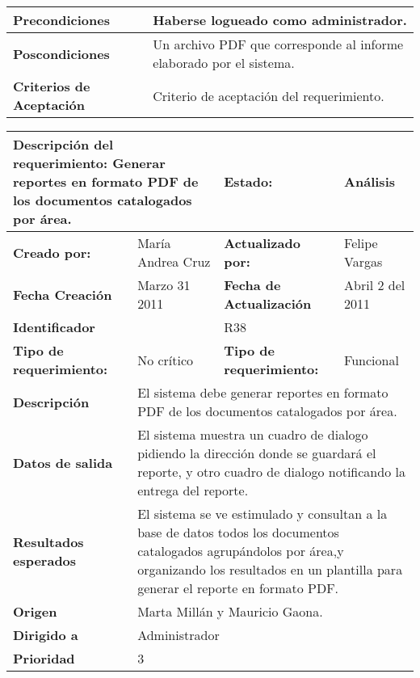 \begin{center}
\begin{longtable}{|p{3cm}|p{3cm}|p{3cm}|p{3cm}|}
\bf Precondiciones &\multicolumn{3}{|p{10cm}|}{Haberse logueado como administrador.} \\
\hline
\hline
\bf Poscondiciones &\multicolumn{3}{|p{10cm}|}{Un archivo PDF que corresponde al informe elaborado por el sistema.} \\
\hline
\bf Criterios de Aceptación &\multicolumn{3}{|p{10cm}|}{Criterio de aceptación del requerimiento.} \\
\hline

\end{longtable}


\begin{longtable}{|p{3cm}|p{3cm}|p{3cm}|p{3cm}|}

\hline
\multicolumn{2}{|p{6cm}|}{{\bf {Descripción del requerimiento:}}  Generar reportes en formato PDF de los documentos catalogados por área. } & \bf{ Estado:} & {Análisis} \\
\hline
\bf {Creado por:} & María Andrea Cruz   & \bf {Actualizado por:} & Felipe Vargas  \\
\hline
\bf {Fecha Creación } & Marzo 31 2011 & \bf {Fecha de  Actualización }& Abril 2 del 2011\\
\hline 
\multicolumn{2}{|p{6cm}|}{\bf Identificador} & \multicolumn{2}{|p{6cm}|}{R38} \\
\hline
\bf {Tipo de requerimiento:} & No crítico &  \bf{Tipo de requerimiento:} & Funcional\\     
\hline
\bf Descripción &\multicolumn{3}{|p{10cm}|}{El sistema debe generar reportes en formato PDF de los documentos catalogados por área.} \\
\hline
\bf Datos de salida &\multicolumn{3}{|p{10cm}|}{El sistema muestra un cuadro de dialogo pidiendo la dirección donde se guardará el reporte, y otro cuadro de dialogo notificando la entrega del reporte.} \\
\hline
\bf Resultados esperados &\multicolumn{3}{|p{10cm}|}{El sistema se ve estimulado y consultan a la base de datos todos los documentos catalogados agrupándolos por área,y  organizando los resultados en un plantilla para generar el reporte en formato PDF.} \\
\hline
\bf Origen &\multicolumn{3}{|p{10cm}|}{Marta Millán y Mauricio Gaona.} \\
\hline
\bf Dirigido a  &\multicolumn{3}{|p{10cm}|}{Administrador} \\
\hline
\bf Prioridad &\multicolumn{3}{|p{10cm}|}{3} \\

\end{longtable}
\end{center}
